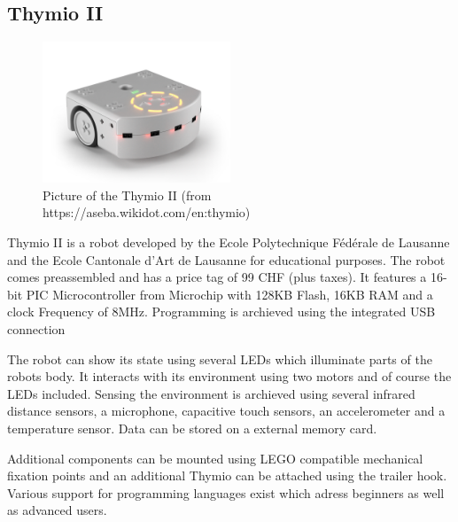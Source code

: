 \documentclass[11pt,a4paper]{article}
\begin{document}
\subsection{Thymio II}
\begin{figure}[H]
  \centering
  \includegraphics[width=0.5\textwidth]{images/thymioii.jpg}
  \caption{Picture of the Thymio II (from https://aseba.wikidot.com/en:thymio)}
\end{figure}

Thymio II is a robot developed by the Ecole Polytechnique Fédérale de Lausanne and the Ecole Cantonale d'Art de Lausanne for educational purposes. The robot comes preassembled and has a price tag of 99 CHF (plus taxes). It features a 16-bit PIC Microcontroller from Microchip with 128KB Flash, 16KB RAM and a clock Frequency of 8MHz. Programming is archieved using the integrated USB connection

The robot can show its state using several LEDs which illuminate parts of the robots body. It interacts with its environment using two motors and of course the LEDs included. Sensing the environment is archieved using several infrared distance sensors, a microphone, capacitive touch sensors, an accelerometer and a temperature sensor. Data can be stored on a external memory card.

Additional components can be mounted using LEGO compatible mechanical fixation points and an additional Thymio can be attached using the trailer hook. Various support for programming languages exist which adress beginners as well as advanced users.
\end{document}
